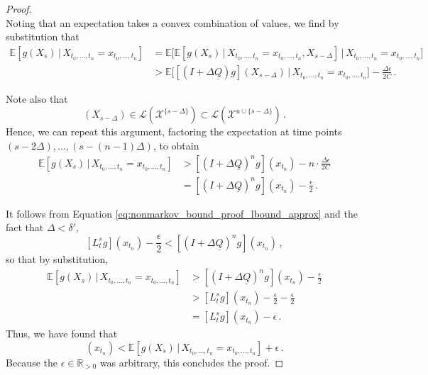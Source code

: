 \documentclass[10pt]{paper}
\theoremstyle{definition}
\newcommand{\reals}{\mathbb{R}}
\newcommand{\realspos}{\reals_{>0}}
\newcommand{\states}{\mathcal{X}}
\newcommand{\gambles}{\mathcal{L}}
\newcommand{\lrate}{\underline{Q}}
\begin{document}
\begin{proof}
\begin{equation*}
\end{equation*}
Noting that an expectation takes a convex combination of values, we find by substitution that
\begin{align*}
\mathbb{E}[g(X_s)\,\vert\,X_{t_0,\ldots,t_n}=x_{t_0,\ldots,t_n}] &= \mathbb{E}\bigl[\mathbb{E}[g(X_s)\,\vert\,X_{t_0,\ldots,t_n}=x_{t_0,\ldots,t_n},X_{s-\Delta}]\,\vert\,X_{t_0,\ldots,t_n}=x_{t_0,\ldots,t_n}\bigr] \\
&> \mathbb{E}\bigl[[(I+\Delta\lrate)g](X_{s-\Delta})\,\vert\,X_{t_0,\ldots,t_n}=x_{t_0,\ldots,t_n}\bigr] - \frac{\Delta\epsilon}{2C}\,.
\end{align*}

Note also that
\begin{equation*}
[(I+\Delta\lrate)g](X_{s-\Delta})\in\gambles(\states^{\{s-\Delta\}})\subset\gambles(\states^{u\cup\{s-\Delta\}})\,.
\end{equation*}
Hence, we can repeat this argument, factoring the expectation at time points $(s-2\Delta),\ldots,(s-(n-1)\Delta)$, to obtain
\begin{align*}
\mathbb{E}[g(X_s)\,\vert\,X_{t_0,\ldots,t_n}=x_{t_0,\ldots,t_n}] &> \left[(I+\Delta\lrate)^ng\right](x_{t_n}) - n\cdot\frac{\Delta\epsilon}{2C} \\
 &= \left[(I+\Delta\lrate)^ng\right](x_{t_n}) - \frac{\epsilon}{2}\,.
\end{align*}

It follows from Equation \eqref{eq:nonmarkov_bound_proof_lbound_approx} and the fact that $\Delta<\delta'$,
\begin{equation*}
\left[L_t^s g\right](x_{t_n}) - \frac{\epsilon}{2} < \left[(I+\Delta\lrate)^n g\right](x_{t_n})\,,
\end{equation*}
so that by substitution,
\begin{align*}
\mathbb{E}[g(X_s)\,\vert\,X_{t_0,\ldots,t_n}=x_{t_0,\ldots,t_n}] &> \left[(I+\Delta\lrate)^ng\right](x_{t_n}) - \frac{\epsilon}{2} \\
 &> [L_t^s g](x_{t_n}) - \frac{\epsilon}{2} - \frac{\epsilon}{2} \\
 &= [L_t^s g](x_{t_n}) - \epsilon\,.
\end{align*}
Thus, we have found that
\begin{equation*}
[L_t^s g](x_{t_n}) < \mathbb{E}[g(X_s)\,\vert\,X_{t_0,\ldots,t_n}=x_{t_0,\ldots,t_n}] + \epsilon\,.
\end{equation*}
Because the $\epsilon\in\realspos$ was arbitrary, this concludes the proof.
\end{proof}
\end{document}
